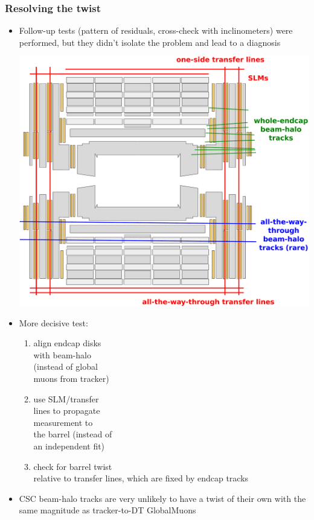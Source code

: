\documentclass[compress]{beamer}
\begin{document}
\begin{frame}
\frametitle{Resolving the twist}
\begin{itemize}
\item Follow-up tests (pattern of residuals, cross-check with inclinometers) were performed, but they didn't isolate the problem and lead to a diagnosis

\hfill \includegraphics[width=0.6\linewidth]{beamhalo_transferlines.pdf}

\vspace{-5.3 cm}
\item More decisive test:
\begin{enumerate}\setlength{\itemsep}{0.2 cm}
\item align endcap disks \\ with beam-halo \\ (instead of global \\ muons from tracker)
\item use SLM/transfer \\ lines to propagate \\ measurement to \\ the barrel (instead of \\ an independent fit)
\item check for barrel twist \\ relative to transfer lines, which are fixed by endcap tracks
\end{enumerate}

\item CSC beam-halo tracks are very unlikely to have a twist of their own with the same magnitude as tracker-to-DT GlobalMuons
\end{itemize}
\end{frame}
\end{document}
